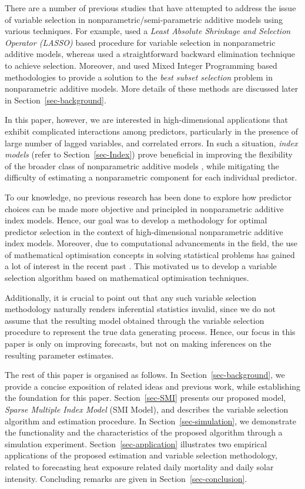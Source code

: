 \documentclass[11pt,a4paper,]{article}
\begin{document}
There are a number of previous studies that have attempted to address
the issue of variable selection in nonparametric/semi-parametric
additive models using various techniques. For example,
\textcite{Huang2010} used a \emph{Least Absolute Shrinkage and Selection
Operator (LASSO)} \autocite{Tibshirani1996} based procedure for variable
selection in nonparametric additive models, whereas \textcite{FH2012}
used a straightforward backward elimination technique to achieve
selection. Moreover, \textcite{Ibrahim2021} and \textcite{Hazimeh2023}
used Mixed Integer Programming based methodologies to provide a solution
to the \emph{best subset selection} problem in nonparametric additive
models. More details of these methods are discussed later in
Section~\ref{sec-background}.

In this paper, however, we are interested in high-dimensional
applications that exhibit complicated interactions among predictors,
particularly in the presence of large number of lagged variables, and
correlated errors. In such a situation, \emph{index models} (refer to
Section~\ref{sec-Index}) prove beneficial in improving the flexibility
of the broader class of nonparametric additive models
\autocite{Radchenko2015}, while mitigating the difficulty of estimating
a nonparametric component for each individual predictor.

To our knowledge, no previous research has been done to explore how
predictor choices can be made more objective and principled in
nonparametric additive index models. Hence, our goal was to develop a
methodology for optimal predictor selection in the context of
high-dimensional nonparametric additive index models. Moreover, due to
computational advancements in the field, the use of mathematical
optimisation concepts in solving statistical problems has gained a lot
of interest in the recent past \autocite{Theusl2020}. This motivated us
to develop a variable selection algorithm based on mathematical
optimisation techniques.

Additionally, it is crucial to point out that any such variable
selection methodology naturally renders inferential statistics invalid,
since we do not assume that the resulting model obtained through the
variable selection procedure to represent the true data generating
process. Hence, our focus in this paper is only on improving forecasts,
but not on making inferences on the resulting parameter estimates.

The rest of this paper is organised as follows. In
Section~\ref{sec-background}, we provide a concise exposition of related
ideas and previous work, while establishing the foundation for this
paper. Section~\ref{sec-SMI} presents our proposed model, \emph{Sparse
Multiple Index Model} (SMI Model), and describes the variable selection
algorithm and estimation procedure. In Section~\ref{sec-simulation}, we
demonstrate the functionality and the characteristics of the proposed
algorithm through a simulation experiment. Section~\ref{sec-application}
illustrates two empirical applications of the proposed estimation and
variable selection methodology, related to forecasting heat exposure
related daily mortality and daily solar intensity. Concluding remarks
are given in Section~\ref{sec-conclusion}.
\end{document}
